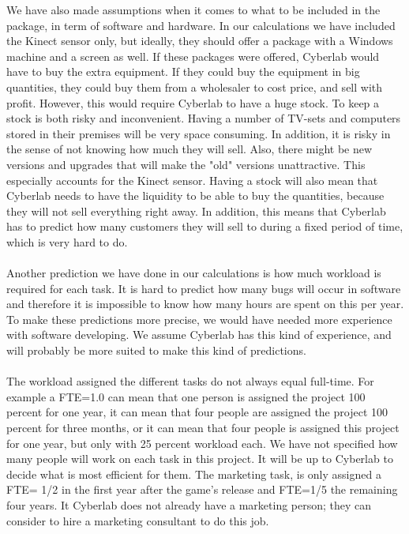 We have also made assumptions when it comes to what to be included in the package, in term of software and hardware. In our calculations we have included the Kinect sensor only, but ideally, they should offer a package with a Windows machine and a screen as well. If these packages were offered, Cyberlab would have to buy the extra equipment. If they could buy the equipment in big quantities, they could buy them from a wholesaler to cost price, and sell with profit. However, this would require Cyberlab to have a huge stock. To keep a stock is both risky and inconvenient. Having a number of TV-sets and computers stored in their premises will be very space consuming. In addition, it is risky in the sense of not knowing how much they will sell. Also, there might be new versions and upgrades that will make the "old" versions unattractive. This especially accounts for the Kinect sensor. Having a stock will also mean that Cyberlab needs to have the liquidity to be able to buy the quantities, because they will not sell everything right away. In addition, this means that Cyberlab has to predict how many customers they will sell to during a fixed period of time, which is very hard to do. \\ \\
Another prediction we have done in our calculations is how much workload is required for each task. It is hard to predict how many bugs will occur in software and therefore it is impossible to know how many hours are spent on this per year. To make these predictions more precise, we would have needed more experience with software developing. We assume Cyberlab has this kind of experience, and will probably be more suited to make this kind of predictions.\\ \\
The workload assigned the different tasks do not always equal full-time. For example a FTE=1.0 can mean that one person is assigned the project 100 percent for one year, it can mean that four people are assigned the project 100 percent for three months, or it can mean that four people is assigned this project for one year, but only with 25 percent workload each. We have not specified how many people will work on each task in this project. It will be up to Cyberlab to decide what is most efficient for them. The marketing task, is only assigned a FTE= 1/2 in the first year after the game’s release and FTE=1/5 the remaining four years. It Cyberlab does not already have a marketing person; they can consider to hire a marketing consultant to do this job. \\ \\
